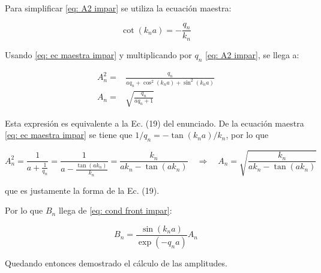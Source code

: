 Para simplificar \ref{eq: A2 impar} se utiliza la ecuación maestra:

\begin{equation}
    \cot(k_na) = -\frac{q_n}{k_n}
    \label{eq: ec maestra impar}
\end{equation}

Usando \ref{eq: ec maestra impar} y multiplicando por $q_n$ \ref{eq: A2 impar}, se llega a:

\begin{align}
    A_n^2 =& \frac{q_n}{aq_n+\cos^2(k_na)+\sin^2(k_na)} \\
    A_n =& \sqrt{\frac{q_n}{aq_n+1}} \label{eq: A impar}
\end{align}

Esta expresión es equivalente a la Ec. (19) del enunciado. De la ecuación maestra \ref{eq: ec maestra impar} se tiene que $1/q_n = -\tan(k_na)/k_n$, por lo que

\begin{equation}
    A_n^2 = \frac{1}{a+\frac{1}{q_n}} = \frac{1}{a-\frac{\tan(ak_n)}{k_n}} = \frac{k_n}{ak_n-\tan(ak_n)}
    \quad\Rightarrow\quad
    A_n = \sqrt{\frac{k_n}{ak_n-\tan(ak_n)}}
\end{equation}

que es justamente la forma de la Ec. (19).

Por lo que $B_n$ llega de \ref{eq: cond front impar}:

\begin{equation}
    B_n = \frac{\sin(k_na)}{\exp(-q_na)}A_n
    \label{eq: B impar}
\end{equation}

Quedando entonces demostrado el cálculo de las amplitudes.


